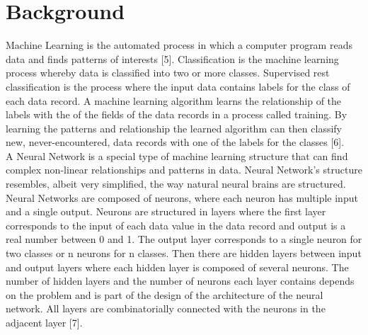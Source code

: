 \documentclass[conference]{IEEEtran}
\begin{document}
\section{Background}
Machine Learning is the automated process in which a computer program reads
data and finds patterns of interests [5]. Classification is the machine learning
process whereby data is classified into two or more classes. Supervised rest
classification is the process where the input data contains labels for the
class of each data record. A machine learning algorithm learns the relationship
of the labels with the of the fields of the data records in a process called
training. By learning the patterns and relationship the learned algorithm can
then classify new, never-encountered, data records with one of the labels for
the classes [6].
\\ \indent A Neural Network is a special type of machine learning structure
that can find complex non-linear relationships and patterns in data. Neural
Network’s structure resembles, albeit very simplified, the way natural neural
brains are structured. Neural Networks are composed of neurons, where each
neuron has multiple input and a single output. Neurons are structured in layers
where the first layer corresponds to the input of each data value in the data
record and output is a real number between 0 and 1. The output layer corresponds
to a single neuron for two classes or n neurons for n classes. Then there are
hidden layers between input and output layers where each hidden layer is
composed of several neurons. The number of hidden layers and the number of
neurons each layer contains depends on the problem and is part of the design of
the architecture of the neural network. All layers are combinatorially connected
with the neurons in the adjacent layer [7].
\end{document}
